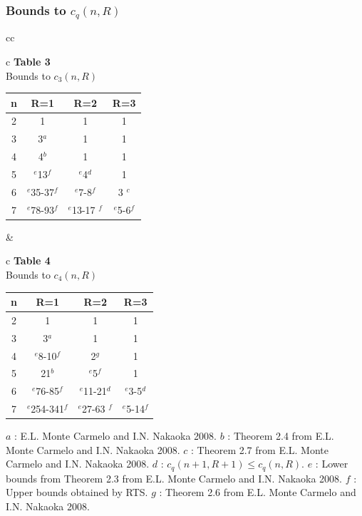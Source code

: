 \documentclass{beamer}
\begin{document}
\begin{frame}
  \frametitle{Bounds to $c_{q}(n,R)$}
{
\scriptsize



\begin{tabular}{cc}
\begin{tabular}{c}
\textbf{Table 3} \\
\newline
Bounds to $c_{3}(n,R)$ \\
\begin{tabular}{|c|c|c|c|}
\hline n & R=1 & R=2 & R=3 \\ \hline
2 & 1 & 1 & 1 \\
3 & 3$^{a}$ & 1 & 1 \\
4 & 4$^{b}$ & 1 & 1 \\
5 & $^{e}$13$^{f}$ & $^{e}$4$^{d}$ & 1 \\
6 & $^{e}$35-37$^{f}$ & $^{e}$7-8$^{f}$ & 3 $^{c}$ \\
7 & $^{e}$78-93$^{f}$ & $^{e}$13-17 $^{f}$ & $^{e}$5-6$^{f}$ \\
\hline
\end{tabular}%
\end{tabular}%
\newline
&
\begin{tabular}{c}
\textbf{Table 4} \\
\newline
Bounds to $c_{4}(n,R)$ \\
\begin{tabular}{|c|c|c|c|}
\hline n & R=1 & R=2 & R=3 \\ \hline
2 & 1 & 1 & 1 \\
3 & 3$^{a}$ & 1 & 1 \\
4 & $^{e}$8-10$^{f}$ & 2$^{g}$ & 1 \\
5 & 21$^{b}$ & $^{e}$5$^{f}$ & 1 \\
6 & $^{e}$76-85$^{f}$ & $^{e}$11-21$^{d}$ & $^{e}$3-5$^{d}$ \\
7 & $^{e}$254-341$^{f}$ & $^{e}$27-63 $^{f}$ & $^{e}$5-14$^{f}$ \\
\hline
\end{tabular}%
\end{tabular}%
\end{tabular}
\newline
\newline
{
\scriptsize

$a$ : E.L. Monte Carmelo and I.N. Nakaoka 2008.\newline
$b$ : Theorem 2.4 from E.L. Monte Carmelo and I.N. Nakaoka 2008.\newline
$c$ : Theorem 2.7 from E.L. Monte Carmelo and I.N. Nakaoka 2008.\newline
$d$ : $c_q(n+1,R+1) \leq c_q(n,R)$.\newline
$e$ : Lower bounds from Theorem 2.3 from E.L. Monte Carmelo and I.N. Nakaoka 2008.\newline
$f$ : Upper bounds obtained by RTS.\newline
$g$ : Theorem 2.6 from E.L. Monte Carmelo and I.N. Nakaoka 2008.\newline
}

}
\end{frame}
\end{document}
